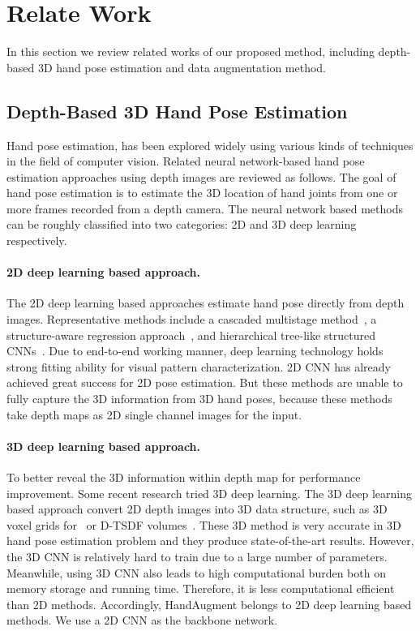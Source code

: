 \documentclass{article}
\begin{document}
\section{Relate Work}
In this section we review related works of our proposed method, including depth-based 3D hand pose estimation and data augmentation method.

\subsection{Depth-Based 3D Hand Pose Estimation}
Hand pose estimation, has been explored widely using various kinds of techniques in the field of computer vision.
Related neural network-based hand pose estimation approaches using depth images are reviewed as follows.
The goal of hand pose estimation is to estimate the 3D location of hand joints from one or more frames recorded from a depth camera. 
The neural network based methods can be roughly classified into two categories: 2D and 3D deep learning respectively.
\paragraph{2D deep learning based approach.} 
The 2D deep learning based approaches estimate hand pose directly from depth images. Representative methods include a cascaded multistage method~\cite{chen2019pose}, a structure-aware regression approach~\cite{taylor2016efficient}, and 
hierarchical tree-like structured CNNs~\cite{madadi2017end}. Due to end-to-end working manner, deep learning technology holds strong fitting ability for visual pattern characterization. 2D CNN has already achieved great success for 2D pose estimation.
But these methods are unable to fully capture the 3D information from 3D hand poses, because these methods take depth maps as 2D single channel images for the input.

\paragraph{3D deep learning based approach.} 
To better reveal the 3D information within depth map for performance improvement. Some recent research tried 3D deep learning. The 3D deep learning based approach convert 2D depth images into 3D data structure, such as 3D voxel grids for~\cite{moon2018v2v} or D-TSDF volumes~\cite{ge20173d}. These 3D method is very accurate in 3D hand pose estimation problem and they produce state-of-the-art results. However, the 3D CNN is relatively hard to train due to a large number of parameters. Meanwhile, using 3D CNN also leads to high computational burden both on memory storage and running time. Therefore, it is less computational efficient than 2D methods.
Accordingly, HandAugment belongs to 2D deep learning based methods. We use a 2D CNN as the backbone network.
\end{document}
